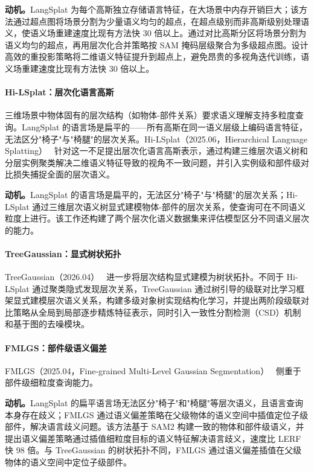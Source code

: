\textbf{动机。}LangSplat 为每个高斯独立存储语言特征，在大场景中内存开销巨大；该方法通过超点图将场景分割为少量语义均匀的超点，在超点级别而非高斯级别处理语义，使语义场重建速度比现有方法快 30 倍以上。通过对比高斯分区将场景分割为语义均匀的超点，再用层次化合并策略按 SAM 掩码层级聚合为多级超点图。设计高效的重投影策略将二维语义特征提升到超点上，避免昂贵的多视角迭代训练，语义场重建速度比现有方法快 30 倍以上。

\paragraph{Hi-LSplat：层次化语言高斯}

三维场景中物体固有的层次结构（如物体-部件关系）要求语义理解支持多粒度查询。LangSplat 的语言场是扁平的——所有高斯在同一语义层级上编码语言特征，无法区分"椅子"与"椅腿"的层次关系。Hi-LSplat（2025.06，Hierarchical Language Splatting）~\cite{2506_06822} 针对这一不足提出层次化语言高斯表示，通过构建三维层次语义树和分层实例聚类解决二维语义特征导致的视角不一致问题，并引入实例级和部件级对比损失捕捉全面的层次语义。

\textbf{动机。}LangSplat 的语言场是扁平的，无法区分"椅子"与"椅腿"的层次关系；Hi-LSplat 通过三维层次语义树显式建模物体-部件的层次关系，使查询可在不同语义粒度上进行。该工作还构建了两个层次化语义数据集来评估模型区分不同语义层次的能力。

\paragraph{TreeGaussian：显式树状拓扑} TreeGaussian（2026.04）~\cite{2604_03309} 进一步将层次结构显式建模为树状拓扑。不同于 Hi-LSplat 通过聚类隐式发现层次关系，TreeGaussian 通过树引导的级联对比学习框架显式建模层次语义关系，构建多级对象树实现结构化学习，并提出两阶段级联对比策略从全局到局部逐步精炼特征表示，同时引入一致性分割检测（CSD）机制和基于图的去噪模块。

\paragraph{FMLGS：部件级语义偏差} FMLGS（2025.04，Fine-grained Multi-Level Gaussian Segmentation）~\cite{2504_08581} 侧重于部件级细粒度查询能力。

\textbf{动机。}LangSplat 的扁平语言场无法区分"椅子"和"椅腿"等层次语义，且语言查询本身存在歧义；FMLGS 通过语义偏差策略在父级物体的语义空间中插值定位子级部件，解决语言歧义问题。该方法基于 SAM2 构建一致的物体和部件级语义，并提出语义偏差策略通过插值细粒度目标的语义特征解决语言歧义，速度比 LERF 快 98 倍。与 TreeGaussian 的树状拓扑不同，FMLGS 通过语义偏差插值在父级物体的语义空间中定位子级部件。

